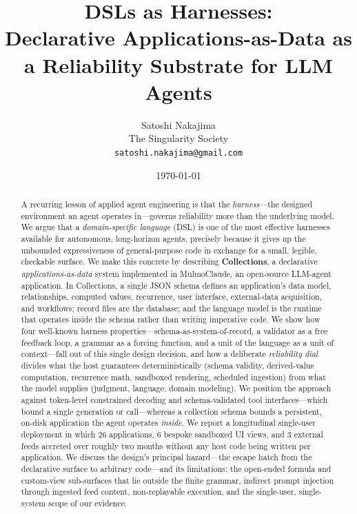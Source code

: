 \documentclass[11pt]{article}
\title{\textbf{DSLs as Harnesses:}\\[2pt]
\large Declarative Applications-as-Data as a Reliability Substrate for LLM Agents}
\author{
  Satoshi Nakajima\\
  \small The Singularity Society\\
  \small \texttt{satoshi.nakajima@gmail.com}
}
\date{\today}
\begin{document}
\maketitle

\begin{abstract}
A recurring lesson of applied agent engineering is that the \emph{harness}---the
designed environment an agent operates in---governs reliability more than the
underlying model. We argue that a \emph{domain-specific language} (DSL) is one of
the most effective harnesses available for autonomous, long-horizon agents,
precisely because it gives up the unbounded expressiveness of general-purpose
code in exchange for a small, legible, checkable surface. We make this concrete
by describing \textbf{Collections}, a declarative \emph{applications-as-data}
system implemented in MulmoClaude, an open-source LLM-agent application. In
Collections, a single JSON schema defines an application's data model,
relationships, computed values, recurrence, user interface, external-data
acquisition, and workflows; record files are the database; and the language model
is the runtime that operates inside the schema rather than writing imperative
code. We show how four well-known harness properties---schema-as-system-of-record,
a validator as a free feedback loop, a grammar as a forcing function, and a unit
of the language as a unit of context---fall out of this single design decision,
and how a deliberate \emph{reliability dial} divides what the host guarantees
deterministically (schema validity, derived-value computation, recurrence math,
sandboxed rendering, scheduled ingestion) from what the model supplies (judgment,
language, domain modeling). We position the approach against token-level
constrained decoding and schema-validated tool interfaces---which bound a single
generation or call---whereas a collection schema bounds a persistent, on-disk
application the agent operates \emph{inside}. We report a longitudinal single-user
deployment in which 26 applications, 6 bespoke sandboxed UI views, and 3 external
feeds accreted over roughly two months without any host code being written per
application. We discuss the design's principal hazard---the escape hatch from the
declarative surface to arbitrary code---and its limitations: the open-ended
formula and custom-view sub-surfaces that lie outside the finite grammar, indirect
prompt injection through ingested feed content, non-replayable execution, and the
single-user, single-system scope of our evidence.
\end{abstract}
\end{document}
